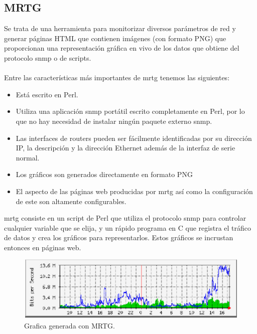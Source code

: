 \documentclass[letterpaper]{article}
\begin{document}
\subsection{MRTG}\label{sub:MRTG}%
Se trata de una herramienta para monitorizar diversos parámetros de red y
generar páginas HTML que contienen imágenes (con formato PNG) que proporcionan
una representación gráfica en vivo de los datos que obtiene del protocolo \acrshort{snmp} o de
scripts.\\\\
Entre las características más importantes de \acrshort{mrtg} tenemos las siguientes:
\begin{itemize}
  \item Está escrito en Perl.
  \item  Utiliza una aplicación \acrshort{snmp} portátil escrito completamente en Perl, por lo
que no hay necesidad de instalar ningún paquete externo \acrshort{snmp}.\@
  \item  Las interfaces de routers pueden ser fácilmente identificadas por su dirección
IP, la descripción y la dirección Ethernet además de la interfaz de serie
normal.
  \item Los gráficos son generados directamente en formato PNG
  \item El aspecto de las páginas web producidas por \acrshort{mrtg} así como la
configuración de este son altamente configurables.
\end{itemize}
\acrshort{mrtg} consiste en un script de Perl que utiliza el protocolo \acrshort{snmp} para
controlar cualquier variable que se elija, y un rápido programa en C que registra el
tráfico de datos y crea los gráficos para representarlos. Estos gráficos se incrustan
entonces en páginas web.
\begin{figure}[H]
  \centering
  \includegraphics[width=\textwidth]{images/MRTG.png}
  \caption{Grafica generada con MRTG.}\label{fig:mrtg}
\end{figure}
\end{document}
